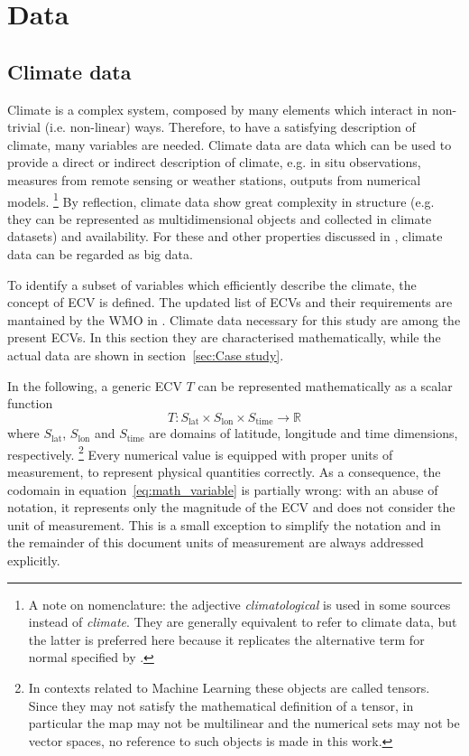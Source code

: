 \section{Data}
\label{sec:Data}



\subsection{Climate data}
Climate is a complex system, composed by many elements which interact in non-trivial (i.e. non-linear) ways. Therefore, to have a satisfying description of climate, many variables are needed.
Climate data are data which can be used to provide a direct or indirect description of climate, e.g. in situ observations, measures from remote sensing or weather stations, outputs from numerical models.%
\footnote{A note on nomenclature: the adjective \emph{climatological} is used in some sources instead of \emph{climate}. They are generally equivalent to refer to climate data, but the latter is preferred here because it replicates the alternative term for \gls{normal} specified by \cite[1]{2017WorldMeteorologicalOrganizationWMOWMOGuidelines}.}
By reflection, climate data show great complexity in structure (e.g. they can be represented as multidimensional objects and collected in climate datasets) and availability. For these and other properties discussed in \cite{2014FaghmousABig}, climate data can be regarded as big data.

To identify a subset of variables which efficiently describe the climate, the concept of \gls{ECV} is defined.\cite{2014BojinskiTheConcept} The updated list of \glspl{ECV} and their requirements are mantained by the \gls{WMO} in \cite[14-17]{2022WorldMeteorologicalOrganizationWMOThe2022}.
Climate data necessary for this study are among the present \glspl{ECV}. In this section they are characterised mathematically, while the actual data are shown in section~\ref{sec:Case study}.

In the following, a generic \gls{ECV} $T$ can be represented mathematically as a scalar function
\begin{equation}
  \label{eq:math_variable}
  T : S_\text{lat} \times S_\text{lon} \times S_\text{time} \to \mathbb{R}
\end{equation}
where $S_\text{lat}$, $S_\text{lon}$ and $S_\text{time}$ are domains of latitude, longitude and time dimensions, respectively.%
\footnote{In contexts related to Machine Learning these objects are called tensors. Since they may not satisfy the mathematical definition of a tensor, in particular the map may not be multilinear and the numerical sets may not be vector spaces, no reference to such objects is made in this work.}
Every numerical value is equipped with proper units of measurement, to represent physical quantities correctly. As a consequence, the codomain in equation~\eqref{eq:math_variable} is partially wrong: with an abuse of notation, it represents only the magnitude of the \gls{ECV} and does not consider the unit of measurement. This is a small exception to simplify the notation and in the remainder of this document units of measurement are always addressed explicitly.

